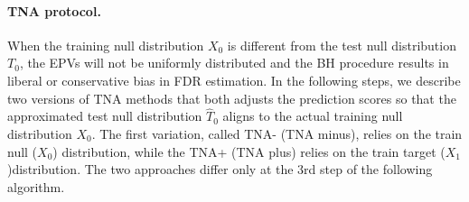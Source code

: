\documentclass{article}
\begin{document}
\paragraph{TNA protocol.} When the training null distribution $X_0$ is different from the test null distribution $T_0$, the EPVs will not be uniformly distributed and the BH procedure results in liberal or conservative bias in FDR estimation. In the following steps, we describe two versions of TNA methods that both adjusts the prediction scores so that the approximated test null distribution $\hat{T}_0$ aligns to the actual training null distribution $X_0$. The first variation, called TNA- (TNA minus), relies on the train null ($X_0$) distribution, while the TNA+ (TNA plus) relies on the train target ($X_1$)distribution. The two approaches differ only at the 3rd step of the following algorithm. 
\end{document}
